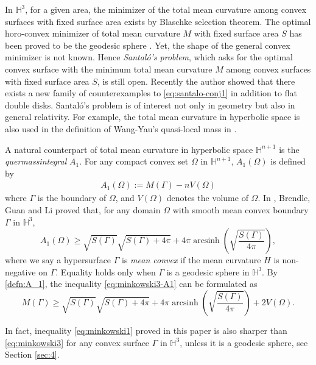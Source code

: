 \documentclass[11pt]{amsart}
\theoremstyle{definition}
\newcommand{\HH}{\mathbb{H}}
\theoremstyle{remark}
\numberwithin{equation}{section}
\begin{document}
	In $\mathbb H^3$, for a given area, the minimizer of the total mean curvature among convex surfaces with fixed surface area exists by Blaschke selection theorem. The optimal horo-convex minimizer of total mean curvature $M$ with fixed surface area $S$ has been proved to be the geodesic sphere \cite[Theorem 6.1]{ge-wang-wu2014}. Yet, the shape of the general convex minimizer is not known. Hence \emph{Santal\'{o}'s problem}, which asks for the optimal convex surface with the minimum total mean curvature $M$ among convex surfaces with fixed surface area $S$, is still open. Recently the author \cite{Hong2026} showed that there exists a new family of counterexamples to \eqref{eq:santalo-conj1} in addition to flat double disks. Santal\'{o}'s problem is of interest not only in geometry but also in general relativity. For example, the total mean curvature in hyperbolic space is also used in the definition of Wang-Yau's quasi-local mass in \cite[Theorem 1.3]{wang-yau2007}.
	
	A natural counterpart of total mean curvature in hyperbolic space $\HH^{n+1}$ is the  \emph{quermassintegral} $A_1$. For any compact convex set $\Omega$ in $\HH^{n+1}$, $A_1(\Omega)$ is defined by
	\begin{align}\label{defn:A_1}
		A_1(\Omega) := M(\Gamma) - n V(\Omega) 
	\end{align}
	where $\Gamma$ is the boundary of $\Omega$, and $V(\Omega)$ denotes the volume of $\Omega$. In \cite{Brendle-Guan-Li}, Brendle, Guan and Li proved that, for any domain $\Omega$ with smooth mean convex boundary $\Gamma$ in $\HH^3$, 
	\begin{equation}\label{eq:minkowski3-A1}
		A_1(\Omega) \geq \sqrt{S(\Gamma)}\sqrt{S(\Gamma)+4\pi} + 4\pi \operatorname{arcsinh}\left( \sqrt{\frac{S(\Gamma)}{4\pi}} \right)
		,
	\end{equation}
	where we say a hypersurface $\Gamma$ is \emph{mean convex} if the mean curvature $H$ is non-negative on $\Gamma$. Equality holds only when $\Gamma$ is a geodesic sphere in $\HH^3$. By \eqref{defn:A_1}, the inequality \eqref{eq:minkowski3-A1} can be formulated as
	\begin{equation}\label{eq:minkowski3}
		M(\Gamma) \geq \sqrt{S(\Gamma)}\sqrt{S(\Gamma)+4\pi} + 4\pi \operatorname{arcsinh}\left( \sqrt{\frac{S(\Gamma)}{4\pi}} \right)
		+ 2 V(\Omega).
	\end{equation}
	 
	In fact, inequality \eqref{eq:minkowski1} proved in this paper is also sharper than \eqref{eq:minkowski3} for any convex surface $\Gamma$ in $\HH^3$, unless it is a geodesic sphere, see Section \ref{sec:4}.
	
\end{document}
